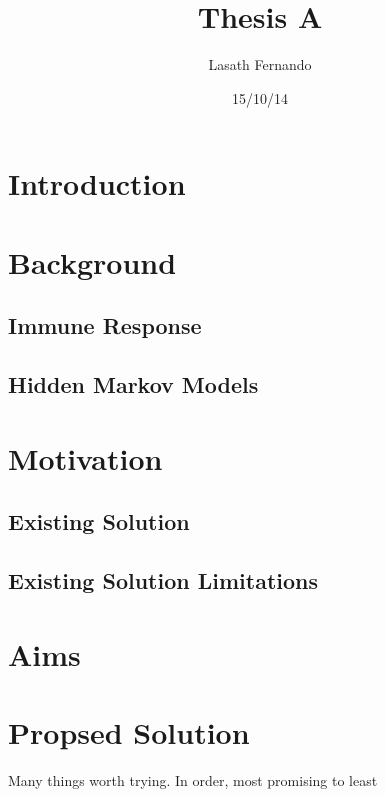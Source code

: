 \documentclass[a4paper,12pt,titlepage]{article}
\author{Lasath Fernando}
\title{Thesis A}
\date{15/10/14}
\begin{document}
\maketitle


\section{Introduction}
\section{Background}
\subsection{Immune Response}
\subsection{Hidden Markov Models}
\section{Motivation}
\subsection{Existing Solution}
\subsection{Existing Solution Limitations}
\section{Aims}
\section{Propsed Solution}
Many things worth trying. In order, most promising to least
\end{document}
